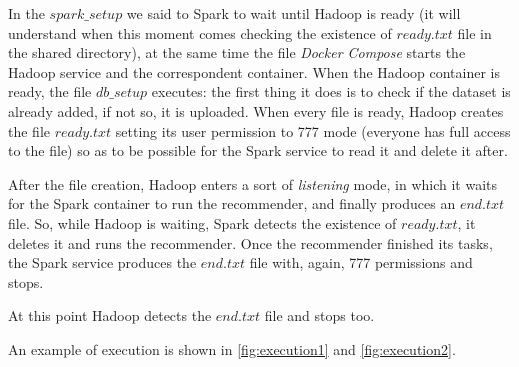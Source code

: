 \documentclass[11pt,a4paper,titlepage]{article}
\begin{document}
In the $spark\_setup$ we said to Spark to wait until Hadoop is ready (it will understand when this moment comes checking the existence of $ready.txt$ file in the shared directory), at the same time the file \textit{Docker Compose} starts the Hadoop service and the correspondent container. When the Hadoop container is ready, the file $db\_setup$ executes: the first thing it does is to check if the dataset is already added, if not so, it is uploaded. When every file is ready, Hadoop creates the file $ready.txt$ setting its user permission to 777 mode (everyone has full access to the file) so as to be possible for the Spark service to read it and delete it after.

After the file creation, Hadoop enters a sort of \textit{listening} mode, in which it waits for the Spark container to run the recommender, and finally produces an $end.txt$ file.
So, while Hadoop is waiting, Spark detects the existence of $ready.txt$, it deletes it and runs the recommender. Once the recommender finished its tasks, the Spark service produces the $end.txt$ file with, again, 777 permissions and stops.

At this point Hadoop detects the $end.txt$ file and stops too.

An example of execution is shown in \autoref{fig:execution1} and \autoref{fig:execution2}.
\end{document}
